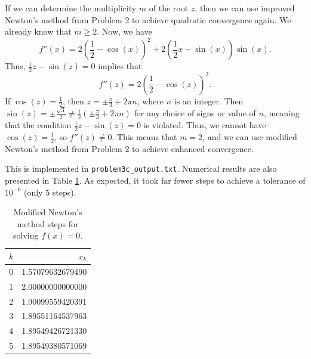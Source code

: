 \documentclass[newpage]{homework}
\begin{document}
\begin{alphaparts}
	\questionpart If we can determine the multiplicity $m$ of the root $z$, then we can use improved Newton's method from Problem 2 to achieve quadratic convergence again. We already know that $m \ge 2$. Now, we have
	\begin{equation*}
		f''(x) = 2\left(\frac{1}{2} - \cos(x)\right)^2 + 2\left(\frac{1}{2}x - \sin(x)\right)\sin(x).
	\end{equation*}
	Thus, $\frac{1}{2}z-\sin(z) = 0$ implies that
	\begin{equation*}
		f''(z) = 2\left(\frac{1}{2} - \cos(z)\right)^2.
	\end{equation*}
	If $\cos(z) = \frac{1}{2}$, then $z = \pm \frac{\pi}{3} + 2\pi n$, where $n$ is an integer. Then $\sin(z) = \pm \frac{\sqrt{3}}{2} \ne \frac{1}{2}\left(\pm \frac{\pi}{3} + 2\pi n\right)$ for any choice of signs or value of $n$, meaning that the condition $\frac{1}{2}z - \sin(z) = 0$ is violated. Thus, we cannot have $\cos(z) = \frac{1}{2}$, so $f''(z) \ne 0$. This means that $m = 2$, and we can use modified Newton's method from Problem 2 to achieve enhanced convergence.
	
	This is implemented in \texttt{problem3c\_output.txt}. Numerical results are also presented in Table \ref{table:problem3c}. As expected, it took far fewer steps to achieve a tolerance of $10^{-6}$ (only 5 steps).
	
	\begin{table}
		\centering
		\begin{tabular}{@{}rr@{}}
			\toprule
			$k$ & $x_k$ \\
			\midrule
			0 & 1.57079632679490 \\
			1 & 2.00000000000000 \\
			2 & 1.90099559420391 \\
			3 & 1.89551164537963 \\
			4 & 1.89549426721330 \\
			5 & 1.89549380571069 \\
			\bottomrule
		\end{tabular}
		\caption{Modified Newton's method steps for solving $f(x) = 0$.}
		\label{table:problem3c}
	\end{table}
\end{alphaparts}
\end{document}
